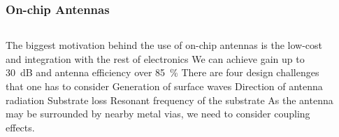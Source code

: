 \documentclass[10pt]{beamer}
\begin{document}
\begin{frame}
    \frametitle{On-chip Antennas}
    \begin{columns}[T]
        \begin{column}{.5\textwidth}
            \begin{outline}
                \small
                \1 The biggest motivation behind the use of on-chip antennas is the low-cost and integration with the rest of electronics
                \1 We can achieve gain up to \SI{30}{\dB} and antenna efficiency over \SI{85}{\percent}
                \1 There are four design challenges that one has to consider
                \2 Generation of surface waves
                \2 Direction of antenna radiation
                \2 Substrate loss
                \2 Resonant frequency of the substrate
                \1 As the antenna may be surrounded by nearby metal vias, we need to consider coupling effects.
            \end{outline}
        \end{column}
        \begin{column}{.5\textwidth}
            \begin{figure}[T!]
                \centering
                 \\
            \end{figure}
        \end{column}
    \end{columns}
\end{frame}
\end{document}
